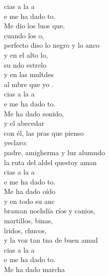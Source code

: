 \documentclass[12pt]{article}
\begin{document}
\begin{multicols*}{2}
\begin{cancion}%
	cias a la a \\
	e me ha dado to.\\
	Me dio los luos que, \\
	cuando los o,\\
	perfecto diso lo negro y lo anco\\
	y en el alto lo, \\
	su ndo estrelo\\
	y en las multdes\\
	al mbre que yo .\\
	cias a la a \\
	e me ha dado to.\\
	Me ha dado sonido, \\
	y el abecedar\\
	con él, las pras que pienso \\
	yeclaro:\\
	padre, amigherma y luz alumndo\\
	la ruta del aldel questoy aman\\
	cias a la a \\
	e me ha dado to.\\
	Me ha dado oído\\
	y en todo su anc\\
	braman nochdía ríos y canios,\\
	martillos, binas, \\
	lridos, chucos,\\
	y la voz tan tna de  buen amad\\
	cias a la a \\
	e me ha dado to.\\
	Me ha dado marcha \\

\end{cancion}
\end{multicols*}
\end{document}
